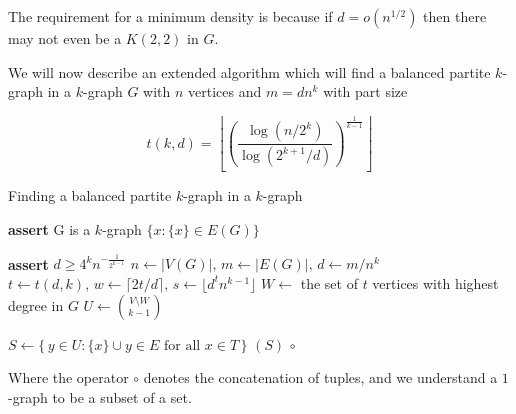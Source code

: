 \begin{remark}
    The requirement for a minimum density is because if $d = o\left(n^{1/2}\right)$ then
    there may not even be a $K(2, 2)$ in $G$. %
\end{remark}

We will now describe an extended algorithm which will find a balanced partite $k$-graph in a $k$-graph $G$ with
$n$ vertices and $m = d n^k$ with part size

\[
    t (k, d) = \left\lfloor \left(  \frac{\log (n/2^k)}{\log (2^{k+1}/d)} \right)^{\frac{1}{k-1}} \right\rfloor
\]

\begin{algorithm}
    \caption{Finding a balanced partite $k$-graph in a $k$-graph}
    \label{alg:kpartite}
    \begin{algorithmic}[1]
            \State \textbf{assert} G is a $k$-graph
                \State \Return $\{x : \{x\} \in E(G)\}$
            \EndIf

            \State \textbf{assert} $d \geq 4^k n^{-\frac{1}{2^{k-1}}}$
            \State $n \gets |V(G)|,\, m \gets |E(G)|,\, d \gets m/n^k$
            \State $t \gets t(d, k),\, w \gets \lceil 2t/d \rceil,\, s \gets \lfloor d^t n^{k-1} \rfloor$
            \State $W \gets$ the set of $t$ vertices with highest degree in $G$
            \State $U \gets \binom{V\setminus W}{k-1}$

                \State $S \gets \{\,y \in U : \{x\} \cup y \in E \text{ for all } x \in T\,\}$
                    \Return $(S)\, \circ $
                \EndIf
            \EndFor
        \EndFunction
    \end{algorithmic}
\end{algorithm}

Where the operator $\circ$ denotes the concatenation of tuples, and we
understand a $1$-graph to be a subset of a set.





